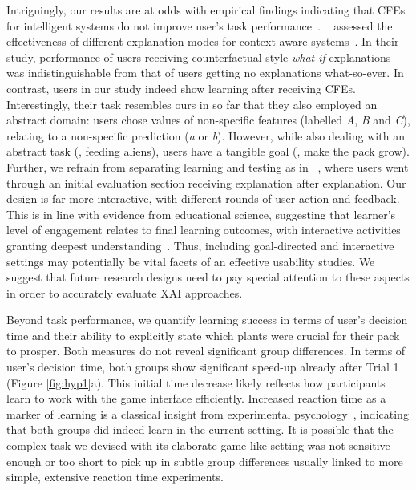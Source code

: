 Intriguingly, our results are at odds with empirical findings indicating that \glspl{CFE} for intelligent systems do not improve user's task performance~\citep{lim_why_2009, van_der_waa_evaluating_2021}.
~\citeauthor{lim_why_2009} assessed the effectiveness of different explanation modes for context-aware systems~\citep{lim_why_2009}. 
In their study, performance of users receiving counterfactual style \textit{what-if}-explanations was indistinguishable from that of users getting no explanations what-so-ever.
In contrast, users in our study indeed show learning after receiving \glspl{CFE}.
Interestingly, their task resembles ours in so far that they also employed an abstract domain: users chose values of non-specific features (labelled \textit{A}, \textit{B} and \textit{C}), relating to a non-specific prediction (\textit{a} or \textit{b}).
However, while also dealing with an abstract task (\ie, feeding aliens), users have a tangible goal (\ie, make the pack grow).
Further, we refrain from separating learning and testing as in ~\citeauthor{lim_why_2009}, where users went through an initial evaluation section receiving explanation after explanation.
Our design is far more interactive, with different rounds of user action and feedback.
This is in line with evidence from educational science, suggesting that learner's level of engagement relates to final learning outcomes, with interactive activities granting deepest understanding~\citep{chi_icap_2014}.
Thus, including goal-directed and interactive settings may potentially be vital facets of an effective usability studies. 
We suggest that future research designs need to pay special attention to these aspects in order to accurately evaluate \gls{XAI} approaches.

Beyond task performance, we quantify learning success in terms of user's decision time and their ability to explicitly state which plants were crucial for their pack to prosper. %
Both measures do not reveal significant group differences.
In terms of user's decision time, both groups show significant speed-up already after Trial 1 (Figure \ref{fig:hyp1}a).
This initial time decrease likely reflects how participants learn to work with the game interface efficiently.
Increased reaction time as a marker of learning is a classical insight from experimental psychology~\citep{logan_shapes_1992}, indicating that both groups did indeed learn in the current setting. 
It is possible that the complex task we devised with its elaborate game-like setting was not sensitive enough or too short to pick up in subtle group differences usually linked to more simple, extensive reaction time experiments.


